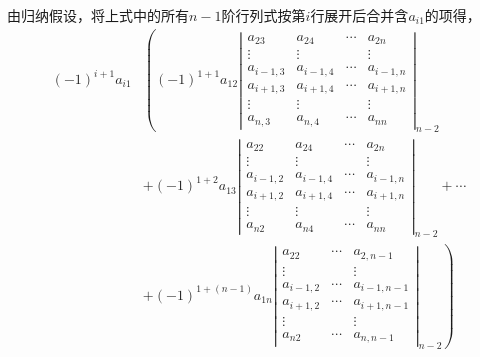 \begin{frame}    
    由归纳假设，将上式中的所有$n-1$阶行列式按第$i$行展开后合并含$a_{i1}$的项得，
    $$
    \begin{aligned}
      (-1)^{i+1}a_{i1}  & \left (  (-1)^{1+1} a_{12}  \left|
          \begin{array}{cccc}
            a_{23}  & a_{24}  & \cdots & a_{2n}\\
            \vdots & \vdots & & \vdots \\
            a_{i-1,3}  & a_{i-1,4}  & \cdots & a_{i-1,n}\\
            a_{i+1,3}  & a_{i+1,4}  & \cdots & a_{i+1,n}\\
            \vdots & \vdots & & \vdots \\
            a_{n,3}  & a_{n,4}  & \cdots & a_{nn}
          \end{array}
        \right|_{n-2} \right. \\
        & + (-1)^{1+2} a_{13}   \left|
          \begin{array}{cccc}
            a_{22} & a_{24}  & \cdots & a_{2n}\\
            \vdots & \vdots & & \vdots \\
            a_{i-1,2} & a_{i-1,4}  & \cdots & a_{i-1,n}\\
            a_{i+1,2} & a_{i+1,4}  & \cdots & a_{i+1,n}\\
            \vdots & \vdots & & \vdots \\
            a_{n2}  & a_{n4} & \cdots & a_{nn}
          \end{array}
        \right|_{n-2}+ \cdots
       \\
      & \left.   +  (-1)^{1+(n-1)} a_{1n}  \left|
          \begin{array}{ccc}
            a_{22}   & \cdots & a_{2,n-1}\\
            \vdots & & \vdots \\
            a_{i-1,2}   & \cdots & a_{i-1,n-1}\\
            a_{i+1,2}   & \cdots & a_{i+1,n-1}\\
            \vdots  & & \vdots \\
            a_{n2}   & \cdots & a_{n,n-1}
          \end{array}
        \right|_{n-2} \right) 
    \end{aligned}
    $$
\end{frame}

